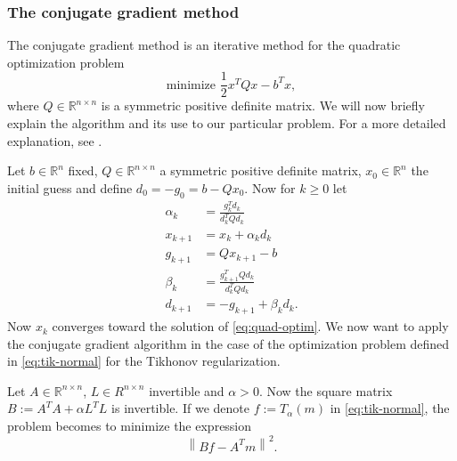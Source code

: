 \documentclass[12pt,a4]{article}
\newcommand{\R}{{\mathbb R}}
\newcommand{\lnorm}{\left\|}
\newcommand{\rnorm}{\right\|}
\begin{document}
\subsubsection{The conjugate gradient method}
\label{sec:conjgrad}

The conjugate gradient method is an iterative method for the quadratic optimization problem
\begin{equation}
\label{eq:quad-optim}
\text{minimize } \frac{1}{2} x^T Q x - b^T x ,
\end{equation}
where $Q \in \R^{n \times n}$ is a symmetric positive definite matrix. We will now briefly explain the algorithm and its use to our particular problem. For a more detailed explanation, see \cite{samu}.

Let $b \in \R^n$ fixed, $Q \in \R^{n \times n}$ a symmetric positive definite matrix, $x_0 \in \R^n$ the initial guess and define $d_0 = -g_0 = b - Q x_0$. Now for $k \geq 0$ let
\begin{equation}
\begin{alignedat}{1}
\alpha_k &= \frac{g_k^T d_k}{d_k^T Q d_k} \\
x_{k+1}  &= x_k + \alpha_k d_k \\
g_{k+1}  &= Q x_{k+1} - b \\
\beta_k  &= \frac{g_{k+1}^T Q d_k}{d_k^T Q d_k} \\
d_{k+1}  &= -g_{k+1} + \beta_k d_k .
\end{alignedat}
\end{equation}
Now $x_k$ converges toward the solution of \eqref{eq:quad-optim}. We now want to apply the conjugate gradient algorithm in the case of the optimization problem defined in \eqref{eq:tik-normal} for the Tikhonov regularization.

Let $A \in \R^{n \times n}$, $L \in R^{n \times n}$ invertible and $\alpha > 0$. Now the square matrix $B := A^T A + \alpha L^T L$ is invertible. If we denote $f := T_\alpha (m)$ in \eqref{eq:tik-normal}, the problem becomes to minimize the expression
\begin{equation}
\label{eq:conjgrad-basis}
\lnorm B f - A^T m \rnorm^2 .
\end{equation}
\end{document}
